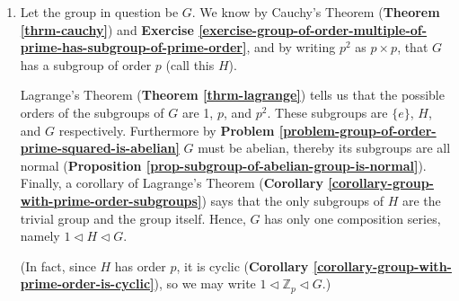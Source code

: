 \begin{enumerate}
    \item Let the group in question be $G$. We know by Cauchy's Theorem (\textbf{Theorem \ref{thrm-cauchy}}) and \textbf{Exercise \ref{exercise-group-of-order-multiple-of-prime-has-subgroup-of-prime-order}}, and by writing $p^2$ as $p \times p$, that $G$ has a subgroup of order $p$ (call this $H$).
    
    Lagrange's Theorem (\textbf{Theorem \ref{thrm-lagrange}}) tells us that the possible orders of the subgroups of $G$ are 1, $p$, and $p^2$. These subgroups are $\{e\}$, $H$, and $G$ respectively. Furthermore by \textbf{Problem \ref{problem-group-of-order-prime-squared-is-abelian}} $G$ must be abelian, thereby its subgroups are all normal (\textbf{Proposition \ref{prop-subgroup-of-abelian-group-is-normal}}). Finally, a corollary of Lagrange's Theorem (\textbf{Corollary \ref{corollary-group-with-prime-order-subgroups}}) says that the only subgroups of $H$ are the trivial group and the group itself. Hence, $G$ has only one composition series, namely $1 \lhd H \lhd G$.
    
    (In fact, since $H$ has order $p$, it is cyclic (\textbf{Corollary \ref{corollary-group-with-prime-order-is-cyclic}}), so we may write $1 \lhd \mathbb{Z}_p \lhd G$.)
\end{enumerate}

